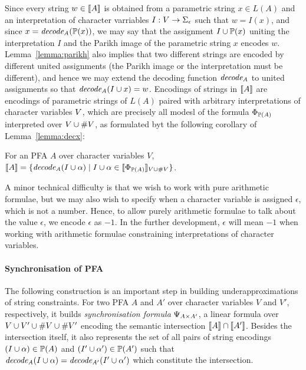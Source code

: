 \documentclass[sigplan,review,anonymous]{acmart}\settopmatter{printfolios=true,printccs=false,printacmref=false}
\begin{document}
Since every string $w \in [\![A]\!]$ is obtained from a parametric string $x\in L(A)$ and an interpretation of character varriables $I:V\rightarrow\Sigma_\epsilon$ such that $w = I(x)$, and since $x = \mathit{decode_{A}}(\mathbb{P}{(x)})$, 
we may say that the assignment $I \cup \mathbb{P}{(x)}$ uniting the interpretation $I$ and the Parikh image of the parametric string $x$ encodes $w$. Lemma~\ref{lemma:parikh} also implies that two different strings are encoded by different united assignments (the Parikh image or the interpretation must be different), and hence we may extend the decoding function $\mathit{decode_{A}}$ to united assignments so that $\mathit{decode_{A}}(I \cup x) = w$.
Encodings of strings in $[\![A]\!]$ are encodings of parametric strings of $L(A)$ paired with arbitrary interpretations of character variables $V$, which are precisely all modesl of the formula $\Phi_{\mathbb{P}{(A)}}$ interpreted over $V\cup\#{V}$, as formulated byt the following corollary of Lemma~\ref{lemma:decx}:
%
\begin{corollary}
For an PFA $A$ over character variables $V$,
$[\![A]\!] = \{\mathit{decode_{A}}(I\cup \alpha) \mid I\cup\alpha\in[\![\Phi_{\mathbb{P}{(A)}}]\!]_{V\cup\#{V}}\}$.
\end{corollary}
%
A minor technical difficulty is that we wish to work with pure arithmetic formulae, 
but we may also wish to specify when a character variable is assigned $\epsilon$, which is not a number. 
Hence, to allow purely arithmetic formulae to talk about the value $\epsilon$, we encode $\epsilon$ as $-1$.
In the further development, $\epsilon$ will mean $-1$ when working with arithmetic formulae constraining interpretations of character variables.

\paragraph{Synchronisation of PFA}
The following construction is an important step in building underapproximations of string constraints. 
For two PFA $A$ and $A'$ over character variables $V$ and $V'$, respectively, 
it builds \emph{synchronisation formula} $\Psi_{A \times A'}$, a linear formula over $V\cup V' \cup \#{V}\cup\#{V'}$ encoding the semantic intersection $[\![A]\!] \cap [\![A']\!]$. 
Besides the intersection itself, it also represents the set of all pairs of string encodings $(I\cup \alpha)\in \mathbb{P}{(A)}$ and $(I'\cup \alpha')\in\mathbb{P}{(A')}$ such that 
$\mathit{decode_{A}}(I\cup \alpha) = \mathit{decode_{A'}}(I'\cup \alpha')$ which constitute the intersection.
\end{document}

